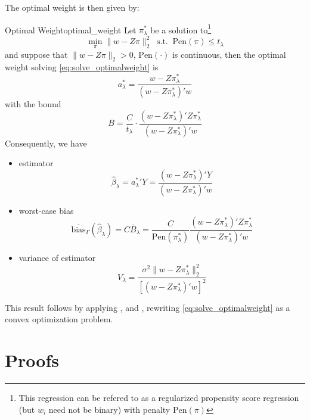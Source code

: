 \documentclass{article}
\begin{document}
The optimal weight is then given by:
\begin{theorem}{Optimal Weight}{optimal_weight}
  Let $\pi^*_{\lambda}$ be a solution to\footnote{This regression can be refered to as a regularized propensity score regression (but $w_i$ need not be binary) with penalty $\mathrm{Pen}(\pi)$}
  \begin{equation}\label{eq:penalizedreg}
    \min_{\pi}\lVert w-Z\pi \rVert^2_2 \ \text{ s.t. }\ \mathrm{Pen}(\pi)\leq t_{\lambda}
  \end{equation}
  and suppose that $\lVert w-Z\pi \rVert_2>0$, $\mathrm{Pen}(\cdot)$ is continuous, then the optimal weight solving \ref{eq:solve_optimalweight} is $$ a^*_{\lambda}=\frac{w-Z\pi_{\lambda}^*}{\left(w-Z\pi_{\lambda}^*\right)'w} $$
  with the bound $$ B=\frac{C}{t_{\lambda}}\cdot \frac{\left(w-Z\pi_{\lambda}^*\right)' Z\pi^*_{\lambda}}{\left(w-Z\pi_{\lambda}^*\right)'w} $$
  Consequently, we have 
  \begin{itemize}
    \item estimator $$ \hat{\beta}_{\lambda} = {a^*_{\lambda}}' Y= \frac{\left( w-Z\pi_{\lambda}^* \right)'Y}{\left(w-Z\pi_{\lambda}^*\right)'w} $$
    \item worst-case bias $$ \bar{\mathrm{bias}}_{\Gamma}\left(\hat{\beta}_{\lambda}\right) = C\bar{B}_{\lambda} = \frac{C}{\mathrm{Pen}\left(\pi^*_{\lambda}\right)}  \frac{\left( w-Z\pi_{\lambda}^* \right)'Z\pi^*_{\lambda}}{\left(w-Z\pi_{\lambda}^*\right)'w}$$
    \item variance of estimator $$ V_{\lambda} = \frac{\sigma^2 \lVert w-Z\pi_{\lambda}^* \rVert^2_2}{\left[ \left(w-Z\pi_{\lambda}^*\right)'w \right]^2} $$ 
  \end{itemize}
\end{theorem}

This result follows by applying \citet{donoho1994statistical}, \citet{low1995bias} and \citet{armstrong2018optimal}, rewriting \ref{eq:solve_optimalweight} as a convex optimization problem.

\newpage
\appendix
\section{Proofs}
\end{document}
